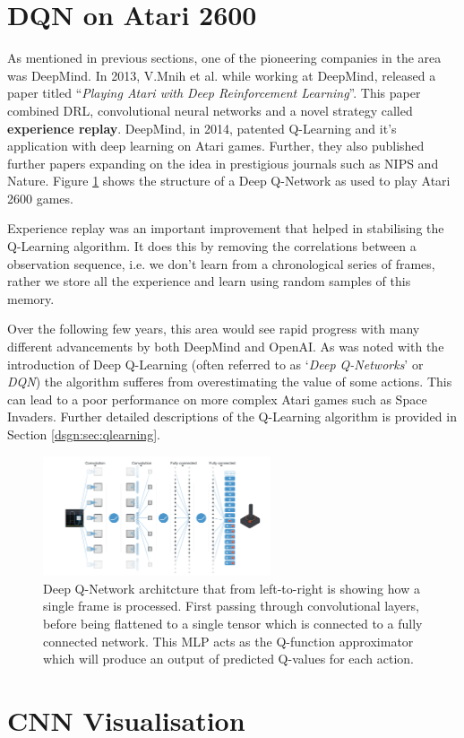 \section{DQN on Atari 2600}
\label{bg:sec:dqn}
As mentioned in previous sections, one of the pioneering companies in the area was DeepMind. In 2013, V.Mnih et al. while working at DeepMind, released a paper titled ``\textit{Playing Atari with Deep Reinforcement Learning}''\cite{dqn}. This paper combined DRL, convolutional neural networks and a novel strategy called \textbf{experience replay}. DeepMind, in 2014, patented Q-Learning and it's application with deep learning on Atari games. Further, they also published further papers expanding on the idea in prestigious journals such as NIPS and Nature. Figure \ref{fig:q-learning-arch} shows the structure of a Deep Q-Network as used to play Atari 2600 games.

Experience replay was an important improvement that helped in stabilising the Q-Learning algorithm. It does this by removing the correlations between a observation sequence, i.e. we don't learn from a chronological series of frames, rather we store all the experience and learn using random samples of this memory.

Over the following few years, this area would see rapid progress with many different advancements by both DeepMind and OpenAI. As was noted with the introduction of Deep Q-Learning (often referred to as `\textit{Deep Q-Networks}' or \textit{DQN}) the algorithm sufferes from overestimating the value of some actions. This can lead to a poor performance on more complex Atari games such as Space Invaders. Further detailed descriptions of the Q-Learning algorithm is provided in Section \ref{dsgn:sec:qlearning}.

\begin{figure}[htbp]
	\centering
	\includegraphics[width=0.60\textwidth]{chapters/chapter2/images/dqn.png}
	\caption[Deep Q-Network architcture]{Deep Q-Network architcture that from left-to-right is showing how a single frame is processed. First passing through convolutional layers, before being flattened to a single tensor which is connected to a fully connected network. This MLP acts as the Q-function approximator which will produce an output of predicted Q-values for each action.
		\label{fig:q-learning-arch}
	}
\end{figure}

\section{CNN Visualisation}
\label{bg:sec:cnn-vis}
